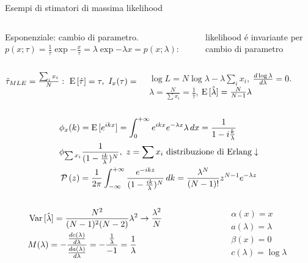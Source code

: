 \begin{wordonframe}{Esempi di stimatori di massima likelihood}
\begin{columns}[T]
\begin{column}{0.6\textwidth}
Esponenziale: cambio di parametro. $p(x;\tau)=\frac{1}{\tau}\exp{-\frac{x}{\tau}}=\lambda\exp{-\lambda x}=p(x;\lambda)$:
\end{column}
\begin{column}{0.4\textwidth}
likelihood \'e invariante per cambio di parametro
\end{column}
\end{columns}
\begin{columns}[b]
\begin{column}{0.4\textwidth}
$\hat{\tau}_{MLE}=\frac{\sum_ix_i}{N}:\ \E{[\hat{\tau}]}=\tau,\ I_x(\tau)=\frac{1}{\var{\hat{\tau}}},\ \var{\hat{\tau}}=\frac{\tau^2}{N}$
\end{column}
\begin{column}{0.6\textwidth}
$\log{L}=N\log{\lambda}-\lambda\sum_ix_i$, $\frac{d \log{\lambda}}{d \lambda}=0$. $\hat{\lambda}=\frac{N}{\sum x_i}=\frac{1}{\hat{\tau}}$, $\operatorname{E}{[\hat{\lambda}]}=\frac{N}{N-1}\lambda$
\end{column}
\end{columns}
\begin{align*}
&\phi_x(k)=\E{[\exp{ikx}]}=\intzi\exp{ikx}\exp{-\lambda x}\lambda\,dx=\frac{1}{1-i\frac{k}{\lambda}}\\
&\phi_{\sum x_i}\frac{1}{(1-\frac{ik}{\lambda})^N},\ z=\sum x_i\ \text{distribuzione di Erlang}\downarrow\\
&\prob{(z)}=\frac{1}{2\pi}\intsinf{}\frac{\exp{-ikz}}{(1-\frac{ik}{\lambda})^N}\,dk=\frac{\lambda^N}{(N-1)!}z^{N-1}\exp{-\lambda z}
\end{align*}
\begin{columns}[T]
\begin{column}{0.65\textwidth}
\begin{align*}
&\operatorname{Var}{[\hat{\lambda}]}=\frac{N^2}{(N-1)^2(N-2)}\lambda^2\to\frac{\lambda^2}{N}\\
&M(\lambda)=-\frac{\frac{d c(\lambda)}{d \lambda}}{\frac{d a(\lambda)}{d \lambda}}=-\frac{\frac{1}{\lambda}}{-1}=\frac{1}{\lambda}
\end{align*}
\end{column}
\begin{column}{0.35\textwidth}
\begin{align*}
&\alpha(x)=x\\
&a(\lambda)=\lambda\\
&\beta(x)=0\\
&c(\lambda)=\log{\lambda}
\end{align*}

\end{column}
\end{columns}
\end{wordonframe}
